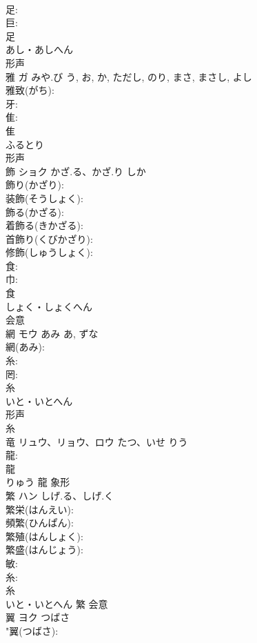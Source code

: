 \documentclass[8pt]{extreport}
\begin{document}
\begin{CJK}{UTF8}{min}
\\	足: 
\\	巨: 
\\	足	
\\	あし・あしへん	
\\	形声 
\\	雅	ガ	みや.び	う, お, か, ただし, のり, まさ, まさし, よし	
\\	雅致(がち): 
\\	牙: 
\\	隹: 
\\	隹	
\\	ふるとり	
\\	形声 
\\	飾	ショク	かざ.る、かざ.り	しか	
\\	飾り(かざり): 
\\	装飾(そうしょく): 
\\	飾る(かざる): 
\\	着飾る(きかざる): 
\\	首飾り(くびかざり): 
\\	修飾(しゅうしょく): 
\\	食: 
\\	巾: 
\\	食	
\\	しょく・しょくへん	
\\	会意 
\\	網	モウ	あみ	あ, ずな	
\\	網(あみ): 
\\	糸: 
\\	罔: 
\\	糸	
\\	いと・いとへん	
\\	形声 
\\	糸 
\\	竜	リュウ、リョウ、ロウ	たつ、いせ	りう	
\\	龍: 
\\	龍	
\\	りゅう	龍	象形 
\\	繁	ハン	しげ.る、しげ.く		
\\	繁栄(はんえい): 
\\	頻繁(ひんぱん): 
\\	繁殖(はんしょく): 
\\	繁盛(はんじょう): 
\\	敏: 
\\	糸: 
\\	糸	
\\	いと・いとへん	繁	会意 
\\	翼	ヨク	つばさ		
\\	"翼(つばさ): 

\end{CJK}
\end{document}
